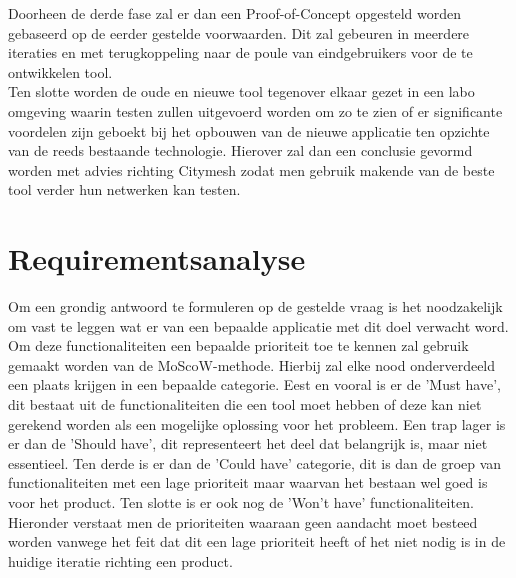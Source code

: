 Doorheen de derde fase zal er dan een Proof-of-Concept opgesteld worden gebaseerd op de eerder gestelde voorwaarden. Dit zal gebeuren in meerdere iteraties en met terugkoppeling naar de poule van eindgebruikers voor de te ontwikkelen tool. \\

Ten slotte worden de oude en nieuwe tool tegenover elkaar gezet in een labo omgeving waarin testen zullen uitgevoerd worden om zo te zien of er significante voordelen zijn geboekt bij het opbouwen van de nieuwe applicatie ten opzichte van de reeds bestaande technologie. Hierover zal dan een conclusie gevormd worden met advies richting Citymesh zodat men gebruik makende van de beste tool verder hun netwerken kan testen.

\section{Requirementsanalyse}

Om een grondig antwoord te formuleren op de gestelde vraag is het noodzakelijk om vast te leggen wat er van een bepaalde applicatie met dit doel verwacht word. Om deze functionaliteiten een bepaalde prioriteit toe te kennen zal gebruik gemaakt worden van de MoScoW-methode. Hierbij zal elke nood onderverdeeld een plaats krijgen in een bepaalde categorie. Eest en vooral is er de 'Must have', dit bestaat uit de functionaliteiten die een tool moet hebben of deze kan niet gerekend worden als een mogelijke oplossing voor het probleem. Een trap lager is er dan de 'Should have', dit representeert het deel dat belangrijk is, maar niet essentieel. Ten derde is er dan de 'Could have' categorie, dit is dan de groep van functionaliteiten met een lage prioriteit maar waarvan het bestaan wel goed is voor het product. Ten slotte is er ook nog de 'Won't have' functionaliteiten. Hieronder verstaat men de prioriteiten waaraan geen aandacht moet besteed worden vanwege het feit dat dit een lage prioriteit heeft of het niet nodig is in de huidige iteratie richting een product. \autocite{Khan2015}

